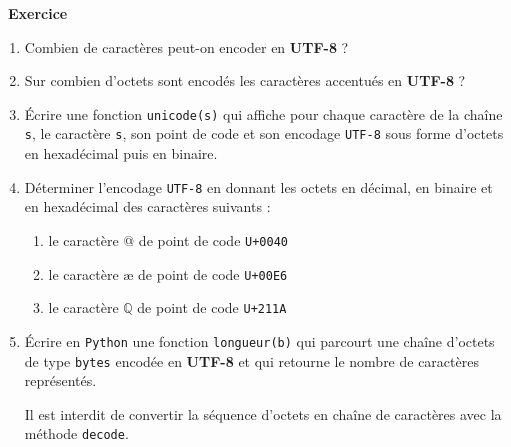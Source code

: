 \documentclass[a4paper, french, 12pt]{article}  %
\newcounter{exo}
\newenvironment{exercice}[1]
{\par \medskip   \addtocounter{exo}{1} \noindent  
\begin{bclogo}[arrondi =0.1,   noborder = true, logo=\bccrayon, marge=4]{~\textbf{Exercice} \textbf{\theexo} {\itshape #1} }  \par}
{
\end{bclogo}
 \par \bigskip }
\newlength{\parpointille}
\newcommand{\Pointilles}[2]{%
\multido{}{#1}{%
\makebox[#2]{\dotfill}\\[\parpointille]
}}
\begin{document}
\begin{exercice}{}
\begin{enumerate}
	\item Combien de caractères peut-on encoder en \textbf{UTF-8} ?
	
	    \Pointilles{1}{\linewidth}
	    
	    
	\item Sur combien d'octets sont encodés les caractères accentués en \textbf{UTF-8} ?
	
	    \Pointilles{1}{\linewidth}
	    
	    
	\item Écrire une fonction \texttt{unicode(s)} qui affiche pour chaque caractère de la chaîne \texttt{s}, le caractère \texttt{s}, son point de code et son encodage \texttt{UTF-8} sous forme d'octets en hexadécimal puis en binaire.
	
	
	    \Pointilles{5}{\linewidth}
	    
	    
	    
	\item Déterminer l'encodage \texttt{UTF-8} en donnant les octets en décimal, en binaire et en hexadécimal des caractères suivants :
		\begin{enumerate}
		    \item le caractère @ de  point de code \texttt{U+0040}
		    
		    \Pointilles{1}{\linewidth}
		    
		    \item le caractère æ  de point de code \texttt{U+00E6}
		    
		        \Pointilles{1}{\linewidth}
		        
			\item le caractère $\mathbb{Q}$ de point de code \texttt{U+211A}
			
			    \Pointilles{1}{\linewidth}
			    
			    
		\end{enumerate}
	\item Écrire en \texttt{Python} une fonction  \texttt{longueur(b)} qui parcourt une chaîne d'octets de type \texttt{bytes} encodée en \textbf{UTF-8} et qui retourne le nombre de caractères représentés.
	
\bcattention{} Il est interdit de convertir la séquence d'octets en chaîne de caractères avec la méthode \texttt{decode}.

    \Pointilles{8}{\linewidth}
    
    
\end{enumerate}


\end{exercice}
\end{document}
